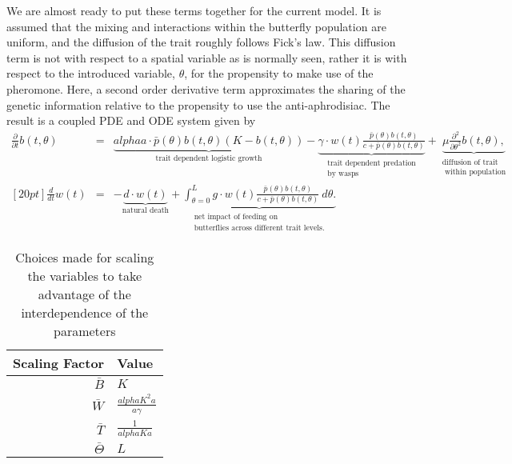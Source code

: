 \documentclass[review,authoryear]{elsarticle}
\def\alpha{alpha}%
\newcommand{\origB}{{b}}
\newcommand{\origW}{{w}}
\newcommand{\origAlpha}{{\alpha}}
\newcommand{\origK}{{K}}
\newcommand{\origGamma}{{\gamma}}
\newcommand{\origA}{{a}}
\newcommand{\origC}{{c}}
\newcommand{\origD}{{d}}
\newcommand{\origG}{{g}}
\newcommand{\origL}{{L}}
\newcommand{\origTheta}{{\theta}}
\newcommand{\origT}{{t}}
\newcommand{\origMu}{{\mu}}
\begin{document}
We are almost ready to put these terms together for the current
model. It is assumed that the mixing and interactions within the
butterfly population are uniform, and the diffusion of the trait
roughly follows Fick's law\citep{logan2006applied}. This diffusion term is not with respect to a spatial variable as is normally seen, rather it is with respect to the introduced variable, $\theta$, for the propensity to make use of the pheromone. Here, a second
order derivative term approximates the sharing of the genetic
information relative to the propensity to use the
anti-aphrodisiac. The result is a coupled PDE and ODE system given by
\begin{eqnarray}
  \label{eq:odePDE1}
  \frac{\partial}{\partial \origT} \origB(\origT,\origTheta) & = &
     \underbrace{  \origAlpha a \cdot \bar{p}(\origTheta) \origB(\origT,\origTheta) (\origK - \origB(\origT,\origTheta)) }_\text{trait dependent logistic growth}
      -  \underbrace{\origGamma \cdot \origW(\origT) \frac{\bar{p}(\origTheta) \origB(\origT,\origTheta)}{\origC+\bar{p}(\origTheta)\origB(\origT,\origTheta)} }_{\substack{\text{trait dependent predation} \\ \text{by wasps}}}
      +  \underbrace{\origMu \frac{\partial^2}{\partial \origTheta^2} \origB(\origT,\origTheta),}_{\substack{\text{diffusion of trait} \\ \text{ within population}}} \\ [20pt]
  \label{eq:odePDE2}
  \frac{d}{d\origT} \origW(\origT) & = & - \underbrace{ \origD \cdot \origW(\origT) }_\text{natural death}  +
        \underbrace{
          \int^{\origL}_{\origTheta=0} \origG \cdot \origW(\origT) \frac{\bar{p}(\origTheta) \origB(\origT,\origTheta) }{\origC + \bar{p}(\origTheta) \origB(\origT,\origTheta)} ~ d\origTheta.
       }_{\substack{\text{net impact of feeding on} \\ \text{butterflies across different trait levels.}}}
\end{eqnarray}


\begin{table}[ht]
  \centering
  \begin{tabular}{r|l}
    Scaling Factor & Value \\ \hline
    $\bar{B}$ & $\origK$ \\ [10pt]
    $\bar{W}$ & $\frac{\origAlpha \origK^2 \origA}{a \origGamma}$ \\  [10pt]
    $\bar{T}$ & $\frac{1}{\origAlpha \origK \origA}$ \\  [10pt]
    $\bar{\Theta}$ & $\origL$
  \end{tabular}
  \caption{Choices made for scaling the variables to take advantage of the interdependence of the parameters}
  \label{tab:scalingChoices}
\end{table}
\end{document}
